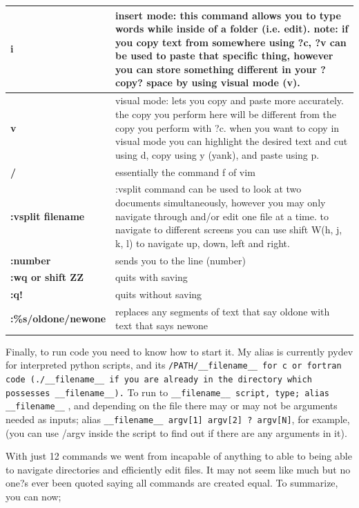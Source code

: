 \documentclass{article}
\newcounter{subsubsubsection}[subsubsection]
\begin{document}
\begin{center}
\begin{tabular*}{\textwidth}{ | p{} | p{}| }
\hline
\textbf{i} & insert mode: this command allows you to type words while inside of a folder (i.e. edit). note: if you copy text from somewhere using ?c, ?v can be used to paste that specific thing, however you can store something different in your ?copy? space by using visual mode (v). \\ 
\hline 
\textbf{v} & visual mode: lets you copy and paste more accurately. the copy you perform here will be different from the copy you perform with ?c. when you want to copy in visual mode you can highlight the desired text and cut using d, copy using y (yank), and paste using p. \\ 
\hline
\textbf{/} & essentially the command f of vim \\ 
\hline 
\textbf{:vsplit filename} & :vsplit command can be used to look at two documents simultaneously, however you may only navigate through and/or edit one file at a time. to navigate to different screens you can use shift W(h, j, k, l) to navigate up, down, left and right. \\
\hline 
\textbf{:number} & sends you to the line (number) \\ 
\hline 
\textbf{:wq or shift ZZ} & quits with saving \\ 
\hline 
\textbf{:q!} & quits without saving \\
\hline
\textbf{:\%s/oldone/newone} & replaces any segments of text that say oldone with text that says newone \\
\hline
\end{tabular*}
\end{center}

Finally, to run code you need to know how to start it. My alias is currently pydev for interpreted python scripts, and its \texttt{/PATH/\_\_filename\_\_ for c or fortran code (./\_\_filename\_\_ if you are already in the directory which possesses \_\_filename\_\_).} To run to \texttt{\_\_filename\_\_ script, type;
alias \_\_filename\_\_} ,
and depending on the file there may or may not be arguments needed as inputs;
alias \texttt{\_\_filename\_\_ argv[1] argv[2] ? argv[N]},
for example, (you can use /argv inside the script to find out if there are any arguments in it).

With just 12 commands we went from incapable of anything to able to being able to navigate directories and efficiently edit files. It may not seem like much but no one?s ever been quoted saying all commands are created equal. To summarize, you can now;
\end{document}
